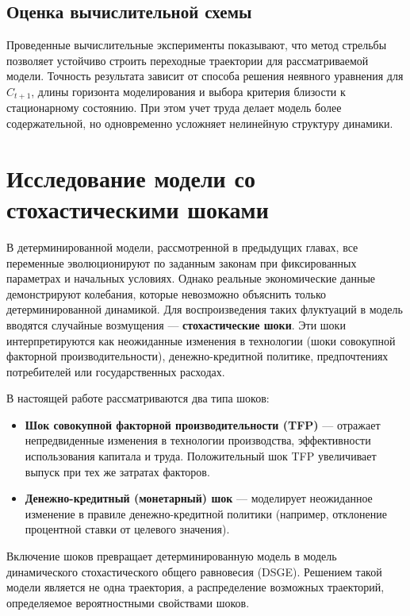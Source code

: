 \documentclass[12pt,a4paper]{report}   %
\begin{document}
        \section{Оценка вычислительной схемы}

            Проведенные вычислительные эксперименты показывают, что метод стрельбы позволяет устойчиво строить переходные траектории для рассматриваемой модели. Точность результата зависит от способа решения неявного уравнения для $C_{t+1}$, длины горизонта моделирования и выбора критерия близости к стационарному состоянию. При этом учет труда делает модель более содержательной, но одновременно усложняет нелинейную структуру динамики.

    \chapter{Исследование модели со стохастическими шоками}

        В детерминированной модели, рассмотренной в предыдущих главах, все переменные эволюционируют по заданным законам при фиксированных параметрах и начальных условиях. Однако реальные экономические данные демонстрируют колебания, которые невозможно объяснить только детерминированной динамикой. Для воспроизведения таких флуктуаций в модель вводятся случайные возмущения — \textbf{стохастические шоки}. Эти шоки интерпретируются как неожиданные изменения в технологии (шоки совокупной факторной производительности), денежно-кредитной политике, предпочтениях потребителей или государственных расходах.

        В настоящей работе рассматриваются два типа шоков:
        \begin{itemize}
            \item \textbf{Шок совокупной факторной производительности (TFP)} — отражает непредвиденные изменения в технологии производства, эффективности использования капитала и труда. Положительный шок TFP увеличивает выпуск при тех же затратах факторов.
            \item \textbf{Денежно-кредитный (монетарный) шок} — моделирует неожиданное изменение в правиле денежно-кредитной политики (например, отклонение процентной ставки от целевого значения).
        \end{itemize}

        Включение шоков превращает детерминированную модель в модель динамического стохастического общего равновесия (DSGE). Решением такой модели является не одна траектория, а распределение возможных траекторий, определяемое вероятностными свойствами шоков.
\end{document}
